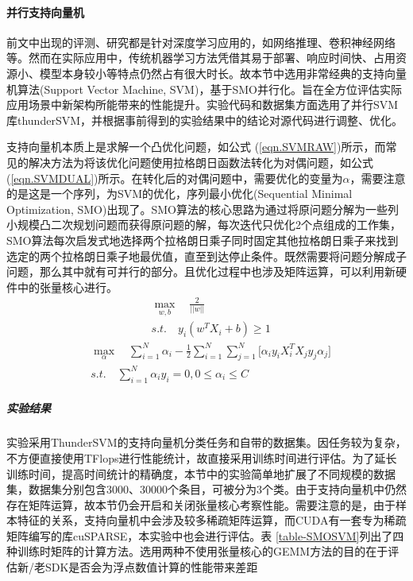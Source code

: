 \paragraph{并行支持向量机}
\par 前文中出现的评测、研究都是针对深度学习应用的，如网络推理、卷积神经网络等。然而在实际应用中，传统机器学习方法凭借其易于部署、响应时间快、占用资源小、模型本身较小等特点仍然占有很大时长。故本节中选用非常经典的支持向量机算法(Support Vector Machine, SVM)，基于SMO并行化。旨在全方位评估实际应用场景中新架构所能带来的性能提升。实验代码和数据集方面选用了并行SVM库thunderSVM，并根据事前得到的实验结果中的结论对源代码进行调整、优化。
\par 支持向量机本质上是求解一个凸优化问题，如公式 (\ref{eqn.SVMRAW})所示，而常见的解决方法为将该优化问题使用拉格朗日函数法转化为对偶问题，如公式 (\ref{eqn.SVMDUAL})所示。在转化后的对偶问题中，需要优化的变量为$ \alpha $，需要注意的是这是一个序列，为SVM的优化，序列最小优化(Sequential Minimal Optimization, SMO)出现了\cite{SMO}。SMO算法的核心思路为通过将原问题分解为一些列小规模凸二次规划问题而获得原问题的解，每次迭代只优化2个点组成的工作集，SMO算法每次启发式地选择两个拉格朗日乘子同时固定其他拉格朗日乘子来找到选定的两个拉格朗日乘子地最优值，直至到达停止条件。既然需要将问题分解成子问题，那么其中就有可并行的部分。且优化过程中也涉及矩阵运算，可以利用新硬件中的张量核心进行。
\begin{equation}
\begin{aligned}
&\max_{w, b} \quad \frac{2}{||w||} \\
&s.t.\quad y_{i}(w^{T}X_{i}+b) \geq 1
\end{aligned}
\label{eqn.SVMRAW}
\end{equation}
\begin{equation}
\begin{aligned}
&\max_{\alpha} \quad \sum_{i=1}^{N}\alpha_{i} - \frac{1}{2}\sum_{i=1}^{N}\sum_{j=1}^{N}\lbrack \alpha_{i}y_{i}X_{i}^{T}X_{j}y_{j}\alpha_{j} \rbrack \\
&s.t.\quad \sum_{i=1}^{N}\alpha_{i}y_{i}=0, 0 \leq \alpha_{i} \leq C
\end{aligned}
\label{eqn.SVMDUAL}
\end{equation}
\subparagraph{实验结果}
\par 实验采用ThunderSVM的支持向量机分类任务和自带的数据集。因任务较为复杂，不方便直接使用TFlops进行性能统计，故直接采用训练时间进行评估。为了延长训练时间，提高时间统计的精确度，本节中的实验简单地扩展了不同规模的数据集，数据集分别包含3000、30000个条目，可被分为3个类。由于支持向量机中仍然存在矩阵运算，故本节仍会开启和关闭张量核心考察性能。需要注意的是，由于样本特征的关系，支持向量机中会涉及较多稀疏矩阵运算，而CUDA有一套专为稀疏矩阵编写的库cuSPARSE，本实验中也会进行评估。表 \ref{table-SMOSVM}列出了四种训练时矩阵的计算方法。选用两种不使用张量核心的GEMM方法的目的在于评估新/老SDK是否会为浮点数值计算的性能带来差距

